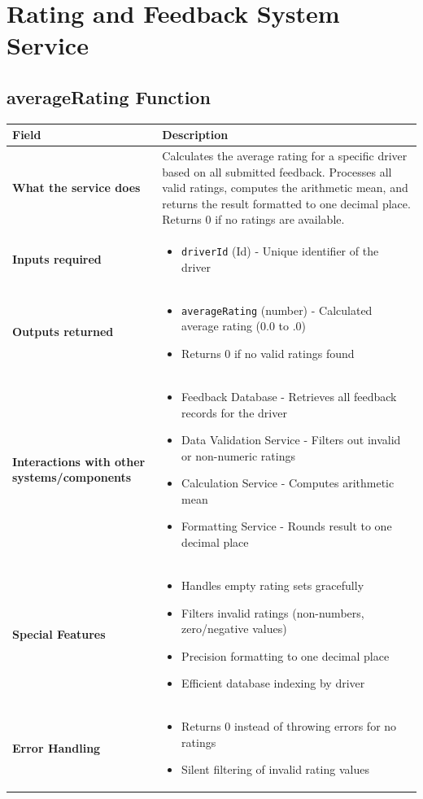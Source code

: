\documentclass[11pt,a4paper]{article}
\begin{document}
\section{Rating and Feedback System Service}

\subsection{averageRating Function}

\begin{longtable}{|p{4cm}|p{12cm}|}
\hline
\textbf{Field} & \textbf{Description} \\
\hline
\textbf{What the service does} & 
Calculates the average rating for a specific driver based on all submitted feedback. Processes all valid ratings, computes the arithmetic mean, and returns the result formatted to one decimal place. Returns 0 if no ratings are available. \\
\hline
\textbf{Inputs required} & 
\begin{itemize}[nosep]
\item \texttt{driverId} (Id) - Unique identifier of the driver
\end{itemize} \\
\hline
\textbf{Outputs returned} & 
\begin{itemize}[nosep]
\item \texttt{averageRating} (number) - Calculated average rating (0.0 to .0)
\item Returns 0 if no valid ratings found
\end{itemize} \\
\hline
\textbf{Interactions with other systems/components} & 
\begin{itemize}[nosep]
\item Feedback Database - Retrieves all feedback records for the driver
\item Data Validation Service - Filters out invalid or non-numeric ratings
\item Calculation Service - Computes arithmetic mean
\item Formatting Service - Rounds result to one decimal place
\end{itemize} \\
\hline
\textbf{Special Features} & 
\begin{itemize}[nosep]
\item Handles empty rating sets gracefully
\item Filters invalid ratings (non-numbers, zero/negative values)
\item Precision formatting to one decimal place
\item Efficient database indexing by driver
\end{itemize} \\
\hline
\textbf{Error Handling} & 
\begin{itemize}[nosep]
\item Returns 0 instead of throwing errors for no ratings
\item Silent filtering of invalid rating values
\end{itemize} \\
\hline
\end{longtable}
\end{document}
